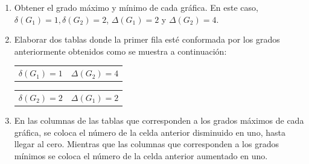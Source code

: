 \documentclass[fleqn, 11pt]{beamer}
\begin{document}
\begin{ejemplo}[breakable, pad at break = 4mm, beforeafter skip = 3mm]{}{}
        \begin{enumerate}
            \item Obtener el grado máximo y mínimo de cada gráfica. En este caso, $ \delta(G_1) = 1, \delta(G_2) = 2 $, \mbox{$ \Delta(G_1) = 2 $} y $ \Delta(G_2) = 4 $. \vspace{3mm}
            \item Elaborar dos tablas donde la primer fila esté conformada por los grados anteriormente obtenidos como se muestra a continuación: \vspace{3mm}
            
            \begin{center}
                \begin{minipage}[h]{0.3\linewidth}
                    \begin{tcolorbox}[title empty, center, colframe = black!99!white, colback = white, sharp corners, hbox, left = -0.9mm, right = -0.9mm, top = -0.9mm, bottom = -0.9mm]
                        \begin{tabular}{c|c}
                            \rowcolor{gray!36!white} 
                            $ \delta(G_1) = 1 $ & $ \Delta(G_2) = 4 $ 
                        \end{tabular}
                    \end{tcolorbox}
                \end{minipage}
                \begin{minipage}[h]{0.3\linewidth}
                    \begin{tcolorbox}[title empty, center, colframe = black!99!white, colback = white, sharp corners, hbox, left = -0.9mm, right = -0.9mm, top = -0.9mm, bottom = -0.9mm]
                        \begin{tabular}{c|c}
                            \rowcolor{gray!36!white} 
                            $ \delta(G_2) = 2 $ & $ \Delta(G_1) = 2 $ 
                        \end{tabular}
                    \end{tcolorbox}
                \end{minipage}
            \end{center} \vspace{3mm}
            
            \item En las columnas de las tablas que corresponden a los grados máximos de cada gráfica, se coloca el número de la celda anterior disminuido en uno, hasta llegar al cero. Mientras que las columnas que corresponden a los grados mínimos se coloca el número de la celda anterior aumentado en uno. \vspace{3mm}
            

\end{enumerate}
\end{ejemplo}
\end{document}
